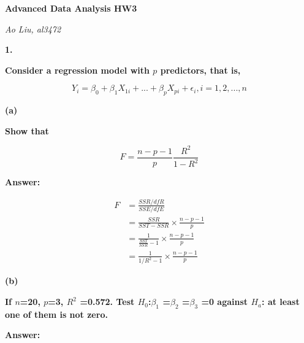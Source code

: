 \documentclass[letterpaper,11pt]{article}
\begin{document}
  \begin{center}
  	\textbf{\Huge{Advanced Data Analysis HW3}}
  \end{center}

  \begin{center}
  	\textsl{Ao Liu, al3472}
  \end{center}


  \bigbreak
  \bigbreak
  \bigbreak


\begin{addmargin}[-2em]{0em}
\large{\textbf{1. }}\end{addmargin}
\begin{addmargin}[-1.1em]{0em} \textbf{Consider a regression model with $p$ predictors, that is,}\par \end{addmargin}
  $$Y_i = \beta_0+\beta_1 X_{1i}+...+\beta_p X_{pi}+\epsilon_i,i=1,2,...,n$$
\bigbreak

\begin{addmargin}[-1.1em]{0em}
\textbf{(a)}\par\end{addmargin}
\textbf{Show that}\par
$$F=\frac{n-p-1}{p}\frac{R^2}{1-R^2}$$

\begin{addmargin}[-0.5em]{0em}
\textbf{Answer: }\end{addmargin}


\begin{align}
F &= \frac{SSR/dfR}{SSE/dfE} \nonumber\\
  &= \frac{SSR}{SST-SSR}\times\frac{n-p-1}{p} \nonumber\\
  &= \frac{1}{\frac{SST}{SSR}-1}\times\frac{n-p-1}{p}\nonumber\\
  &= \frac{1}{1/R^2-1}\times\frac{n-p-1}{p}\nonumber
\end{align}


\begin{addmargin}[-1.1em]{0em}
\textbf{(b)}\par\end{addmargin}
  \textbf{If $n$=20, $p$=3, $R^2$ =0.572. Test $H_0$:$\beta_1$ =$\beta_2$ =$\beta_3$ =0 against $H_a$: at least one of them is not zero.}\par
\bigbreak

\begin{addmargin}[-0.5em]{0em}
\textbf{Answer: }\end{addmargin}
\end{document}
